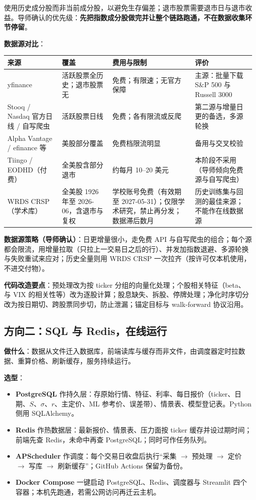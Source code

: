 \documentclass[11pt]{ctexart}
\begin{document}
使用历史成分股而非当前成分股，以避免生存偏差；退市股票需要退市日与退市收益。导师确认的优先级：\textbf{先把指数成分股做完并让整个链路跑通，不在数据收集环节停留}。

\textbf{数据源对比}：
\begin{center}\small
\begin{tabular}{p{2.6cm}p{3.2cm}p{3.6cm}p{5.2cm}}
\toprule
来源 & 覆盖 & 费用与限制 & 评价 \\
\midrule
yfinance & 活跃股票全历史；退市股票无 & 免费；有限速；无官方保障 & 主源：批量下载 S\&P 500 与 Russell 3000 \\
Stooq / Nasdaq 官方日线 / 自写爬虫 & 活跃股票日线 & 免费；各有限流或反爬 & 第二源与增量日更的备选，多源轮换 \\
Alpha Vantage / efinance 等 & 美股部分覆盖 & 免费档限流明显 & 备用与交叉校验 \\
Tiingo / EODHD（付费） & 全美股含部分退市 & 约每月 10--20 美元 & 本阶段不采用（导师倾向免费源与自写爬虫） \\
WRDS CRSP（学术库） & 全美股 1926 年至 2026-06，含退市与复权 & 学校账号免费（有效期至 2027-05-31）；仅限学术研究，禁止再分发；数据滞后数月 & 历史训练集与回测的最佳来源；不能作在线数据源 \\
\bottomrule
\end{tabular}
\end{center}

\textbf{数据源策略（导师确认）}：日更增量很小，走免费 API 与自写爬虫的组合；每个源都会限流，用增量拉取（只拉上一交易日之后的行）、并发加指数退避、多源轮换与失败重试来应对；历史全量则用 WRDS CRSP 一次拉齐（按许可仅本机使用，不进交付物）。

\textbf{代码改造要点}：预处理改为按 ticker 分组的向量化处理；个股相关特征（beta、与 VIX 的相关性等）改为逐股计算；股息缺失、拆股、停牌处理；净化时序切分改为按日期切、跨股票同步切，防止泄漏；锚定目标与 walk-forward 协议沿用。

\subsection{方向二：SQL 与 Redis，在线运行}

\textbf{做什么}：数据从文件迁入数据库，前端读库与缓存而非文件，由调度器定时拉数据、重算价格、刷新缓存，服务持续运行。

\textbf{选型}：
\begin{itemize}
  \item \textbf{PostgreSQL} 作持久层：存原始行情、特征、利率、每日报价（ticker、日期、$S$、$\sigma$、$r$、主定价、ML 参考价、误差带）、情景表、模型登记表。Python 侧用 SQLAlchemy。
  \item \textbf{Redis} 作热数据层：最新报价、情景表、压力面按 ticker 缓存并设过期时间；前端先查 Redis，未命中再查 PostgreSQL；同时可作任务队列。
  \item \textbf{APScheduler} 作调度：每个交易日收盘后执行“采集 $\to$ 预处理 $\to$ 定价 $\to$ 写库 $\to$ 刷新缓存”；GitHub Actions 保留为备份。
  \item \textbf{Docker Compose} 一键启动 PostgreSQL、Redis、调度器与 Streamlit 四个容器；本机先跑通，若需公网访问再迁云主机。
\end{itemize}
\end{document}
